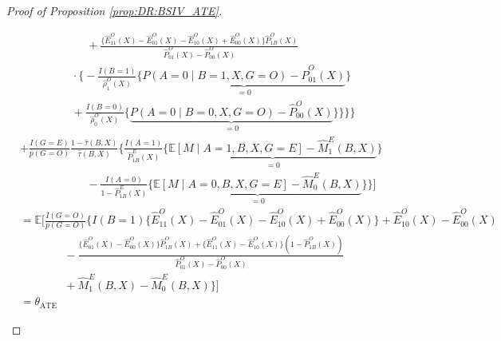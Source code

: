 \documentclass[10pt]{article}
\newcommand{\E}{\mathbb{E}}
\begin{document}
\begin{proof}[Proof of Proposition \ref{prop:DR:BSIV_ATE}]
\begin{itemize}
{\begin{align*}
    &~~~~~~~~~~~~~~~~~~~~~~~~~~~ +\frac{\{\hat{E}_{11}^O(X)-\hat{E}_{01}^O(X)-\hat{E}_{10}^O(X)+\hat{E}_{00}^O(X)\}\hat{P}_{1B}^O(X)}{\hat{P}_{01}^O(X)-\hat{P}_{00}^O(X)}\\
    &~~~~~~~~~~~~~~~~~~~~~\cdot\big\{-\frac{I(B=1)}{\hat{\rho}_1^O(X)}\{\underbrace{P(A=0\mid B=1,X,G=O)-\hat{P}_{01}^O(X)}_{=0}\}\\
    &~~~~~~~~~~~~~~~~~~~~~+\frac{I(B=0)}{\hat{\rho}_0^O(X)}\{\underbrace{P(A=0\mid B=0,X,G=O)-\hat{P}_{00}^O(X)}_{=0}\}\big\}\bigg\}\Bigg\}\\
    &+\frac{I(G=E)}{p(G=O)}\frac{1-\hat{\tau}(B,X)}{\hat{\tau}(B,X)}\bigg\{\frac{I(A=1)}{\hat{P}_{1B}^E(X)}\{\underbrace{\E[M\mid A=1,B,X,G=E]-\hat{M}_1^E(B,X)}_{=0}\}\\
    &~~~~~~~~~~~~~~~~~~~~~~~~~~~ -\frac{I(A=0)}{1-\hat{P}_{1B}^E(X)}\{\underbrace{\E[M\mid A=0,B,X,G=E]-\hat{M}_0^E(B,X)}_{=0}\}\bigg\}\Big]\\
    &=\E\Big[\frac{I(G=O)}{p(G=O)}\Bigg\{I(B=1)\{\hat{E}_{11}^O(X)-\hat{E}_{01}^O(X)-\hat{E}_{10}^O(X)+\hat{E}_{00}^O(X)\}+\hat{E}_{10}^O(X)-\hat{E}_{00}^O(X)\\
    &\ \ \ \ \ \ \ \ \ \ \ \ \ \ \ \ \ \ -\frac{\{\hat{E}_{01}^O(X)-\hat{E}_{00}^O(X)\}\hat{P}_{1B}^O(X)+\{\hat{E}_{11}^O(X)-\hat{E}_{10}^O(X)\}(1-\hat{P}_{1B}^O(X))}{\hat{P}_{01}^O(X)-\hat{P}_{00}^O(X)}\\
    &\ \ \ \ \ \ \ \ \ \ \ \ \ \ \ \ \ \ +\hat{M}_1^E(B,X)-\hat{M}_0^E(B,X)\Bigg\}\Big]\\
&=\theta_{\text{ATE}}
\end{align*}}
\endgroup


\end{itemize}
\end{proof}
\end{document}
